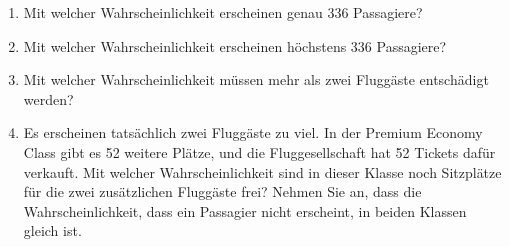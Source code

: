 \begin{ueb}
\begin{enumerate}
              \begin{enumerate}
                  \item Mit welcher Wahrscheinlichkeit erscheinen genau 336 Passagiere?
                  \item Mit welcher Wahrscheinlichkeit erscheinen höchstens 336 Passagiere?
                  \item Mit welcher Wahrscheinlichkeit müssen mehr als zwei Fluggäste entschädigt werden?
                  \item Es erscheinen tatsächlich zwei Fluggäste zu viel. In der Premium Economy Class gibt es 52 weitere Plätze, und die Fluggesellschaft hat 52 Tickets dafür verkauft. Mit welcher Wahrscheinlichkeit sind in dieser Klasse noch Sitzplätze für die zwei zusätzlichen Fluggäste frei?     Nehmen Sie an, dass die Wahrscheinlichkeit, dass ein Passagier nicht erscheint, in beiden Klassen gleich ist.
              \end{enumerate}
    \end{enumerate}

\end{ueb}



